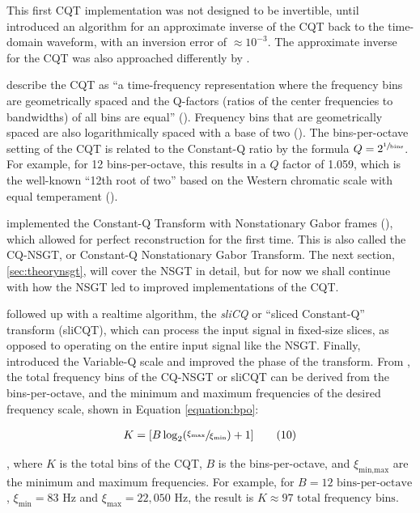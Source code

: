 \documentclass[report.tex]{subfiles}
\begin{document}
This first CQT implementation was not designed to be invertible, until \textcite{klapuricqt} introduced an algorithm for an approximate inverse of the CQT back to the time-domain waveform, with an inversion error of $\approx 10^{-3}$. The approximate inverse for the CQT was also approached differently by \textcite{fitzgeraldcqt}.

\citeauthor{klapuricqt} describe the CQT as ``a time-frequency representation where the frequency bins are geometrically spaced and the Q-factors (ratios of the center frequencies to bandwidths) of all bins are equal'' (\cite[1]{klapuricqt}). Frequency bins that are geometrically spaced are also logarithmically spaced with a base of two (\cite{geometriclog}). The bins-per-octave setting of the CQT is related to the Constant-Q ratio by the formula $Q = 2^{\sfrac{1}{\text{bins}}}$. For example, for 12 bins-per-octave, this results in a $Q$ factor of 1.059, which is the well-known ``12th root of two'' based on the Western chromatic scale with equal temperament (\cite{westernpitch1, westernpitch2}).

\textcite{invertiblecqt} implemented the Constant-Q Transform with Nonstationary Gabor frames (\cite{balazs}), which allowed for perfect reconstruction for the first time. This is also called the CQ-NSGT, or Constant-Q Nonstationary Gabor Transform. The next section, \ref{sec:theorynsgt}, will cover the NSGT in detail, but for now we shall continue with how the NSGT led to improved implementations of the CQT.

\textcite{slicq} followed up with a realtime algorithm, the \textit{sliCQ} or ``sliced Constant-Q'' transform (sliCQT), which can process the input signal in fixed-size slices, as opposed to operating on the entire input signal like the NSGT. Finally, \textcite{variableq1} introduced the Variable-Q scale and improved the phase of the transform. From \textcite{invertiblecqt}, the total frequency bins of the CQ-NSGT or sliCQT can be derived from the bins-per-octave, and the minimum and maximum frequencies of the desired frequency scale, shown in Equation \ref{equation:bpo}:

\begin{align}
	K = [B \log_{2}(\sfrac{\xi_{\text{max}}}{\xi_{\text{min}}}) + 1]\tag{10}\label{equation:bpo}
\end{align}

, where $K$ is the total bins of the CQT, $B$ is the bins-per-octave, and $\xi_{\text{min,max}}$ are the minimum and maximum frequencies. For example, for $B = 12 \text{ bins-per-octave}$, $\xi_{\text{min}} = 83 \text{ Hz}$ and $\xi_{\text{max}} = 22{,}050 \text{ Hz}$, the result is $K \approx 97 \text{ total frequency bins}$.
\end{document}
